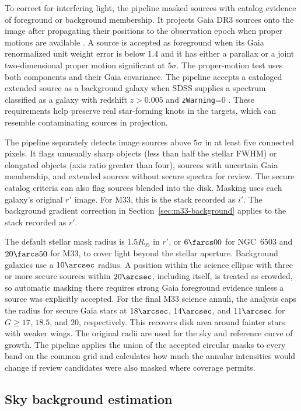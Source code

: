 To correct for interfering light, the pipeline masked sources with catalog evidence of foreground or background membership. It projects Gaia DR3 sources onto the image after propagating their positions to the observation epoch when proper motions are available \citep{methGaia}. A source is accepted as foreground when its Gaia renormalized unit weight error is below 1.4 and it has either a parallax or a joint two-dimensional proper motion significant at $5\sigma$. The proper-motion test uses both components and their Gaia covariance. The pipeline accepts a cataloged extended source as a background galaxy when SDSS supplies a spectrum classified as a galaxy with redshift $z>0.005$ and \texttt{zWarning}=0 \citep{methDR17}. These requirements help preserve real star-forming knots in the targets, which can resemble contaminating sources in projection.

The pipeline separately detects image sources above $5\sigma$ in at least five connected pixels. It flags unusually sharp objects (less than half the stellar FWHM) or elongated objects (axis ratio greater than four), sources with uncertain Gaia membership, and extended sources without secure spectra for review. The secure catalog criteria can also flag sources blended into the disk. Masking uses each galaxy's original $r'$ image. For M33, this is the stack recorded as $i'$. The background gradient correction in Section~\ref{sec:m33-background} applies to the stack recorded as $r'$.

The default stellar mask radius is $1.5R_{95}$ in $r'$, or $6\farcs00$ for NGC~6503 and $20\farcs50$ for M33, to cover light beyond the stellar aperture. Background galaxies use a $10\arcsec$ radius. A position within the science ellipse with three or more secure sources within $20\arcsec$, including itself, is treated as crowded, so automatic masking there requires strong Gaia foreground evidence unless a source was explicitly accepted. For the final M33 science annuli, the analysis caps the radius for secure Gaia stars at $18\arcsec$, $14\arcsec$, and $11\arcsec$ for $G\geq17$, $18.5$, and $20$, respectively. This recovers disk area around fainter stars with weaker wings. The original radii are used for the sky and reference curve of growth. The pipeline applies the union of the accepted circular masks to every band on the common grid and calculates how much the annular intensities would change if review candidates were also masked where coverage permits.

\subsection{Sky background estimation}
\label{sec:sky}

